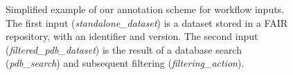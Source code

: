 \begin{figure}[!ht]
    \centering 
    \caption{Simplified example of our annotation scheme for workflow inputs. The first input (\emph{standalone\_dataset}) is a dataset stored in a FAIR repository, with an identifier and version. The second input (\emph{filtered\_pdb\_dataset}) is the result of a database search (\emph{pdb\_search}) and subsequent filtering (\emph{filtering\_action}).}
    \inputminted[linenos,xleftmargin=\parindent, breaklines, frame=single]{yaml}{renske-cwlprov-analysis/annotations/input.yml}
    \label{fig:renske:ex_annotations}
\end{figure}
